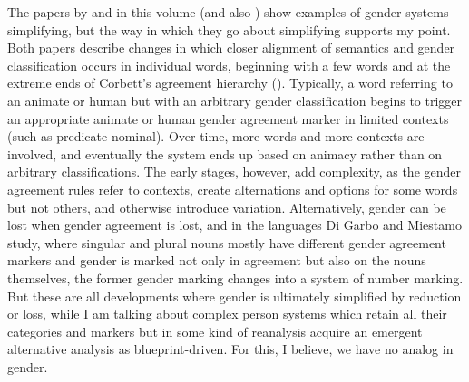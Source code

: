 \documentclass[output=collectionpaper]{langsci/langscibook}
\begin{document}
The papers by \citet{DiGarbothisyear} and \citet{Liljegrenthisyear} in this volume (and also \citealt{Maho1999}) show examples of gender systems simplifying, but the way in which they go about simplifying supports my point. Both papers describe changes in which closer alignment of semantics and gender classification occurs in individual words, beginning with a few words and at the extreme ends of Corbett's agreement hierarchy (\citealt*[248--259]{Corbett1991}). Typically, a word referring to an animate or human but with an arbitrary gender classification begins to trigger an appropriate animate or human gender agreement marker in limited contexts (such as predicate nominal). Over time, more words and more contexts are involved, and eventually the system ends up based on animacy rather than on arbitrary classifications. The early stages, however, add complexity, as the gender agreement rules refer to contexts, create alternations and options for some words but not others, and otherwise introduce variation. Alternatively, gender can be lost when gender agreement is lost, and in the languages Di Garbo and Miestamo study, where singular and plural nouns mostly have different gender agreement markers and gender is marked not only in agreement but also on the nouns themselves, the former gender marking changes into a system of number marking. But these are all developments where gender is ultimately simplified by reduction or loss, while I am talking about complex person systems which retain all their categories and markers but in some kind of reanalysis acquire an emergent alternative analysis as blueprint-driven. For this, I believe, we have no analog in gender.
\end{document}
